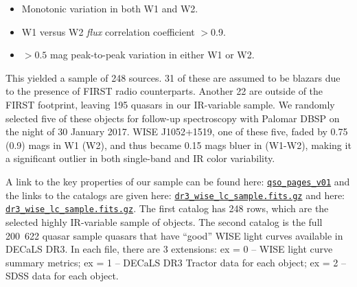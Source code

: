 \documentclass[apj]{emulateapj}
\begin{document}
\begin{itemize}
\item Monotonic variation in both W1 and W2.
\item W1 versus W2 \textit{flux} correlation coefficient $>$0.9.
\item $>0.5$ mag peak-to-peak variation in either W1 or W2.
\end{itemize}

This yielded a sample of 248 sources. 31 of these are assumed to be blazars 
due to the presence of FIRST radio counterparts. Another 22 are outside of the 
FIRST  footprint, leaving 195 quasars in our IR-variable sample. We randomly 
selected five of these objects for follow-up spectroscopy with Palomar DBSP on
the night of 30 January 2017. WISE J1052+1519, one of these five, 
faded by 0.75 (0.9) mags in W1 (W2), and thus became 0.15 mags bluer in 
(W1-W2), making it a significant outlier in both single-band and IR color 
variability.

A link to the key properties of our sample can be found here:
\href{http://portal.nersc.gov/project/cosmo/temp/ameisner/qso\_pages\_v01/}
{\tt qso\_pages\_v01} and the links to the catalogs are given here: 
\href{http://portal.nersc.gov/project/cosmo/temp/ameisner/dr3_wise_lc_sample.fits.gz}{{\tt dr3\_wise\_lc\_sample.fits.gz}} and here:
\href{http://portal.nersc.gov/project/cosmo/temp/ameisner/dr3_wise_lc_metrics_all_qso.fits.gz}{{\tt dr3\_wise\_lc\_sample.fits.gz}}. 
The first catalog has 248 rows, which are the selected highly
IR-variable sample of objects.  The second catalog is the full
\hbox{200 622} quasar sample quasars that have ``good'' WISE light
curves available in DECaLS DR3. In each file, there are 3 extensions:
ex = 0 -- WISE light curve summary metrics; ex = 1 -- DECaLS DR3
Tractor data for each object; ex = 2 -- SDSS data for each object.
\end{document}
